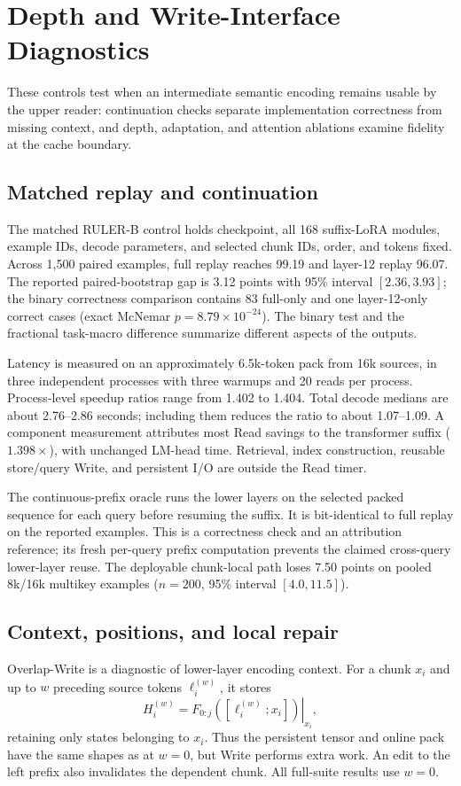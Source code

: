 \FloatBarrier
\section{Depth and Write-Interface Diagnostics}
\label{app:diagnostics}
These controls test when an intermediate semantic encoding remains usable by the upper reader: continuation checks separate implementation correctness from missing context, and depth, adaptation, and attention ablations examine fidelity at the cache boundary.
\subsection{Matched replay and continuation}

The matched RULER-B control holds checkpoint, all 168 suffix-LoRA modules, example IDs, decode parameters, and selected chunk IDs, order, and tokens fixed. Across 1,500 paired examples, full replay reaches 99.19 and layer-12 replay 96.07. The reported paired-bootstrap gap is 3.12 points with 95\% interval $[2.36,3.93]$; the binary correctness comparison contains 83 full-only and one layer-12-only correct cases (exact McNemar $p=8.79\times10^{-24}$). The binary test and the fractional task-macro difference summarize different aspects of the outputs.

Latency is measured on an approximately 6.5k-token pack from 16k sources, in three independent processes with three warmups and 20 reads per process. Process-level speedup ratios range from 1.402 to 1.404. Total decode medians are about 2.76--2.86 seconds; including them reduces the ratio to about 1.07--1.09. A component measurement attributes most Read savings to the transformer suffix ($1.398\times$), with unchanged LM-head time. Retrieval, index construction, reusable store/query Write, and persistent I/O are outside the Read timer.

The continuous-prefix oracle runs the lower layers on the selected packed sequence for each query before resuming the suffix. It is bit-identical to full replay on the reported examples. This is a correctness check and an attribution reference; its fresh per-query prefix computation prevents the claimed cross-query lower-layer reuse. The deployable chunk-local path loses 7.50 points on pooled 8k/16k multikey examples ($n=200$, 95\% interval $[4.0,11.5]$).

\subsection{Context, positions, and local repair}
\label{sec:overlap}


Overlap-Write is a diagnostic of lower-layer encoding context. For a chunk $x_i$ and up to $w$ preceding source tokens $\ell_i^{(w)}$, it stores
\begin{equation}
 H_i^{(w)}=\left.F_{0:j}([\ell_i^{(w)};x_i])\right|_{x_i},
 \label{eq:overlap}
\end{equation}
retaining only states belonging to $x_i$. Thus the persistent tensor and online pack have the same shapes as at $w=0$, but Write performs extra work. An edit to the left prefix also invalidates the dependent chunk. All full-suite results use $w=0$.

